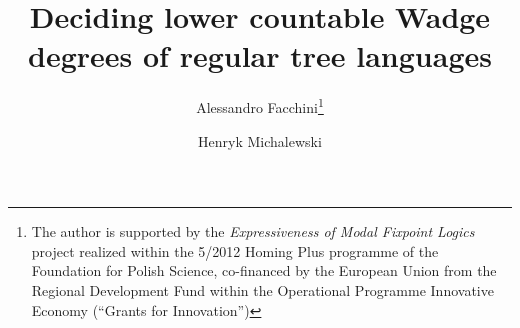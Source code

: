 \documentclass{llncs}
\begin{document}
\frontmatter          

\pagestyle{headings}  

\addtocmark{} 

\mainmatter            

\title{Deciding lower countable Wadge degrees of regular tree languages}


\author{Alessandro Facchini\thanks{The author is supported by the \emph{Expressiveness of Modal Fixpoint Logics} project realized within the 5/2012 Homing Plus programme of the Foundation for Polish Science, co-financed by the European Union from the Regional Development Fund within the Operational Programme Innovative Economy (``Grants for Innovation'')} \and Henryk Michalewski}


\maketitle              
















%
\end{document}
